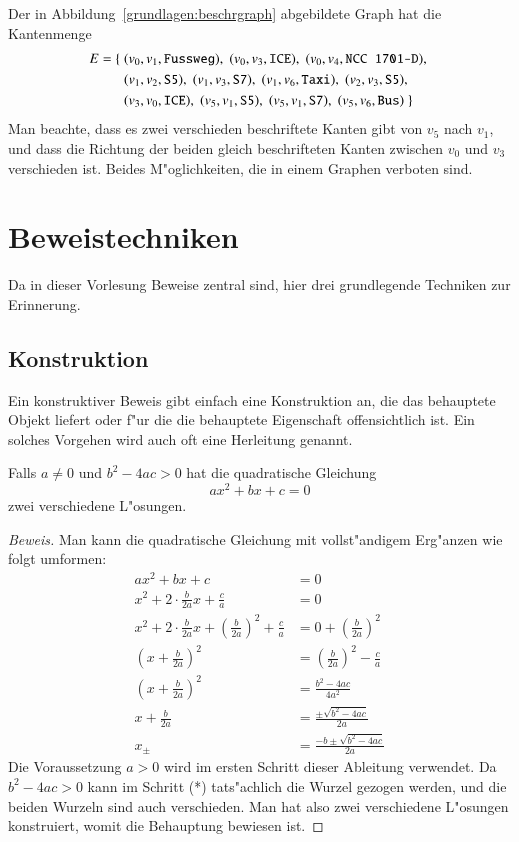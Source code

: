 Der in Abbildung~\ref{grundlagen:beschrgraph} abgebildete Graph
hat die Kantenmenge 
\begin{align*}
E=\{\;
&
(v_0,v_1,\text{\tt Fussweg}),\;
(v_0,v_3,\text{\tt ICE}),\;
(v_0,v_4,\text{\tt NCC 1701-D}),\;
\\&
(v_1,v_2,\text{\tt S5}),\;
(v_1,v_3,\text{\tt S7}),\;
(v_1,v_6,\text{\tt Taxi}),\;
(v_2,v_3,\text{\tt S5}),\;
\\&
(v_3,v_0,\text{\tt ICE}),\;
(v_5,v_1,\text{\tt S5}),\;
(v_5,v_1,\text{\tt S7}),\;
(v_5,v_6,\text{\tt Bus})\;
\}
\end{align*}
Man beachte, dass es zwei verschieden beschriftete Kanten gibt
von $v_5$ nach $v_1$, und dass die Richtung der beiden gleich
beschrifteten Kanten zwischen $v_0$ und $v_3$ verschieden ist.
Beides M"oglichkeiten, die in einem Graphen verboten sind.

\section{Beweistechniken}
Da in dieser Vorlesung Beweise zentral sind, hier drei grundlegende 
Techniken zur Erinnerung.

\subsection{Konstruktion}
Ein konstruktiver Beweis gibt einfach eine Konstruktion an, die
das behauptete Objekt liefert oder f"ur die die behauptete Eigenschaft
offensichtlich ist.
Ein solches Vorgehen wird auch oft eine Herleitung genannt.

\begin{satz}
Falls $a\ne0$ und $b^2-4ac>0$ hat die quadratische Gleichung
\[
ax^2+bx+c=0
\]
zwei verschiedene L"osungen.
\end{satz}

\begin{proof}[Beweis]
Man kann die quadratische Gleichung mit vollst"andigem Erg"anzen wie
folgt umformen:
\begin{align*}
ax^2+bx+c&=0\\
x^2+2\cdot \frac{b}{2a} x +\frac{c}a&=0\\
x^2+2\cdot \frac{b}{2a} x 
+\left(\frac{b}{2a}\right)^2
+\frac{c}a&=0
+\left(\frac{b}{2a}\right)^2\\
\left(x+\frac{b}{2a}\right)^2 &= \left(\frac{b}{2a}\right)^2 -\frac{c}a \\
\left(x+\frac{b}{2a}\right)^2 &=
\frac{b^2-4ac}{4a^2}\\
x+\frac{b}{2a}&=\frac{\pm\sqrt{b^2-4ac}}{2a}\tag{*}\\
x_{\pm}&=\frac{-b\pm\sqrt{b^2-4ac}}{2a}
\end{align*}
Die Voraussetzung $a>0$ wird im ersten Schritt dieser Ableitung verwendet.
Da $b^2-4ac>0$ kann im Schritt (*) tats"achlich die Wurzel gezogen werden,
und die beiden Wurzeln sind auch verschieden. Man hat also zwei verschiedene
L"osungen konstruiert, womit die Behauptung bewiesen ist.
\end{proof}

